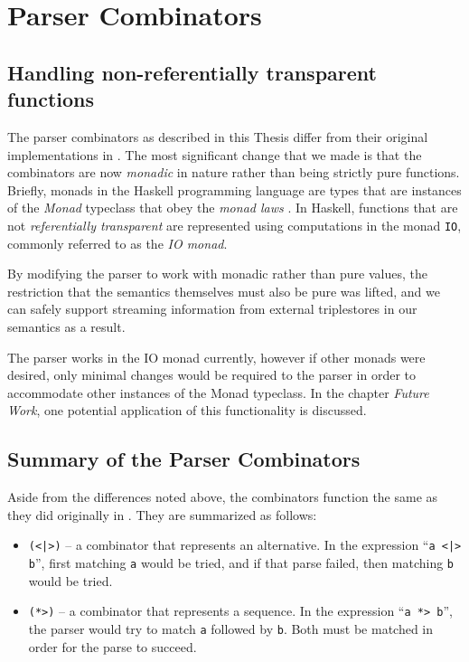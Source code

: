 \documentclass[../main.tex]{subfiles}
\begin{document}
\chapter{Parser Combinators}

\section{Handling non-referentially transparent functions}

The parser combinators as described in this Thesis differ from their original implementations
in \cite{frosthafiz2008}.  The most significant change that we made is that the combinators are now {\em monadic} in nature rather than being strictly pure functions.
Briefly, monads in the Haskell programming language are types that are instances of the {\em Monad} typeclass that obey the
{\em monad laws} \cite{monadlaws}.  In Haskell, functions that are not {\em referentially transparent} are represented using computations in the monad \texttt{IO}, commonly referred to as the {\em IO monad}.

By modifying the parser to work with monadic rather than pure values, the restriction that the semantics themselves must also be pure was lifted, and
we can safely support streaming information from external triplestores in our semantics as a result.

The parser works in the IO monad currently, however if other monads were desired, only minimal changes would be required to the parser in order to accommodate
other instances of the Monad typeclass.  In the chapter {\em Future Work}, one potential application of this functionality is discussed.


\section{Summary of the Parser Combinators}

Aside from the differences noted above, the combinators function the same as they did originally in \cite{frosthafiz2008}.  They are summarized as follows:

\begin{itemize}
	\item \texttt{(<|>)} -- a combinator that represents an alternative.  In the expression ``\texttt{a <|> b}'', first matching \texttt{a} would be tried, and if that parse failed, then matching \texttt{b} would be tried.
	\item \texttt{(*>)} -- a combinator that represents a sequence.  In the expression ``\texttt{a *> b}'', the parser would try to match \texttt{a} followed by \texttt{b}.  Both must be matched in order for the parse to succeed.
\end{itemize}
\end{document}
